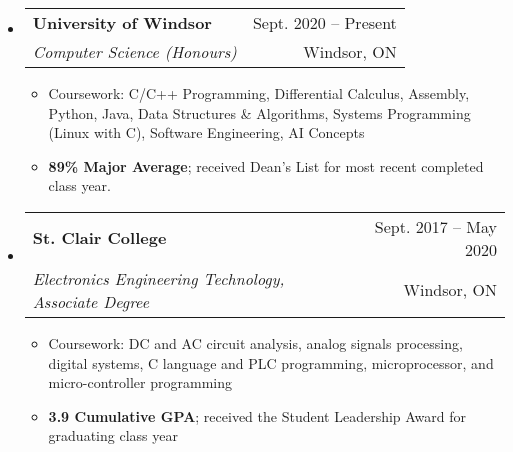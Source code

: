\documentclass[letterpaper,11pt]{article}
\makeatletter
\newcommand{\resumeItem}[1]{
  \item\small{
    {#1 \vspace{-1pt}}
  }
}
\newcommand{\resumeSubheading}[4]{
  \vspace{-1pt}\item
    \begin{tabular*}{\textwidth}[t]{l@{\extracolsep{\fill}}r}
      \textbf{#1} & {\color{dark-grey}\small #2}\vspace{1pt}\\ %
      \textit{#3} & {\color{dark-grey} \small #4}\\ %
    \end{tabular*}\vspace{-4pt}
}
\newcommand{\resumeSubHeadingListStart}{\begin{itemize}[leftmargin=0in, label={}]}
\newcommand{\resumeSubHeadingListEnd}{\end{itemize}}
\newcommand{\resumeItemListStart}{\begin{itemize}}
\newcommand{\resumeItemListEnd}{\end{itemize}\vspace{0pt}}
\makeatother
\begin{document}
\resumeSubHeadingListStart
\resumeSubheading
{University of Windsor}{Sept. 2020 -- Present}
{Computer Science (Honours)}{Windsor, ON}
\resumeItemListStart
\resumeItem {Coursework: C/C++ Programming, Differential Calculus, Assembly, Python, Java, Data Structures \& Algorithms, Systems Programming (Linux with C), Software Engineering, AI Concepts}
\resumeItem {\textbf{89\% Major Average}; received Dean's List for most recent completed class year.}
\resumeItemListEnd
\resumeSubHeadingListEnd

\resumeSubHeadingListStart
\resumeSubheading
{St. Clair College}{Sept. 2017 -- May 2020}
{Electronics Engineering Technology, Associate Degree}{Windsor, ON}
\resumeItemListStart
\resumeItem {Coursework: DC and AC circuit analysis, analog signals processing, digital systems, C language and PLC programming, microprocessor, and micro-controller programming}
\resumeItem {\textbf{3.9 Cumulative GPA}; received the Student Leadership Award for graduating class year}
\resumeItemListEnd
\resumeSubHeadingListEnd


%


\end{document}
